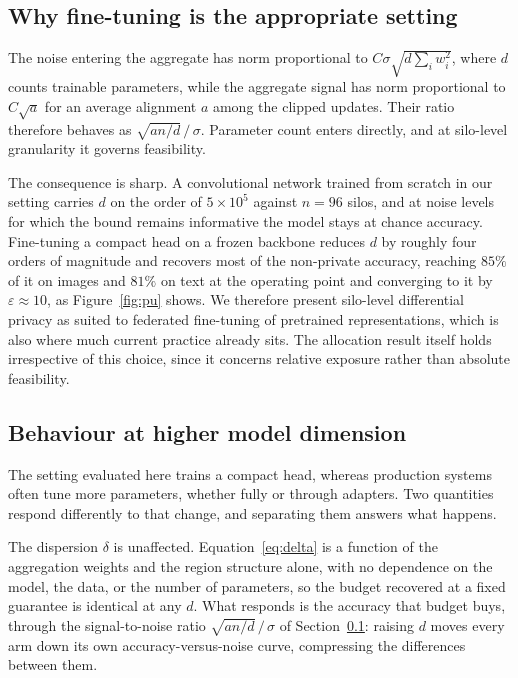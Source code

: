 \documentclass[acmsmall,screen,review,anonymous]{acmart}
\theoremstyle{acmdefinition}%
\begin{document}
\subsection{Why fine-tuning is the appropriate setting}
\label{sec:finetune}

The noise entering the aggregate has norm proportional to $C \sigma \sqrt{d
\sum_i w_i^2}$, where $d$ counts trainable parameters, while the aggregate signal
has norm proportional to $C \sqrt{a}$ for an average alignment $a$ among the
clipped updates. Their ratio therefore behaves as $\sqrt{a n / d} \, / \, \sigma$.
Parameter count enters directly, and at silo-level granularity it governs
feasibility.

The consequence is sharp. A convolutional network trained from scratch in our
setting carries $d$ on the order of $5 \times 10^5$ against $n = 96$ silos, and at
noise levels for which the bound remains informative the model stays at chance
accuracy. Fine-tuning a compact head on a frozen backbone reduces $d$ by roughly
four orders of magnitude and recovers most of the non-private accuracy, reaching
$85\%$ of it on images and $81\%$ on text at the operating point and converging to
it by $\varepsilon \approx 10$, as Figure~\ref{fig:pu} shows. We therefore present
silo-level differential privacy as suited to federated fine-tuning of pretrained
representations, which is also where much current practice already sits. The
allocation result itself holds irrespective of this choice, since it concerns
relative exposure rather than absolute feasibility.

\subsection{Behaviour at higher model dimension}
\label{sec:dimension}

The setting evaluated here trains a compact head, whereas production systems often
tune more parameters, whether fully or through adapters. Two quantities respond
differently to that change, and separating them answers what happens.

The dispersion $\delta$ is unaffected. Equation~\eqref{eq:delta} is a function of
the aggregation weights and the region structure alone, with no dependence on the
model, the data, or the number of parameters, so the budget recovered at a fixed
guarantee is identical at any $d$. What responds is the accuracy that budget buys,
through the signal-to-noise ratio $\sqrt{an/d}\,/\,\sigma$ of
Section~\ref{sec:finetune}: raising $d$ moves every arm down its own
accuracy-versus-noise curve, compressing the differences between them.
\end{document}

